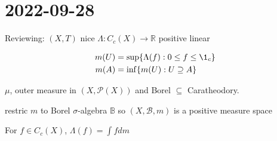 \section{ 2022-09-28 }


Reviewing: $(X,T)$ nice $\Lambda : C_c (X) \to \mathbb{R}$ positive linear

\begin{align*}
	m(U) &= \sup\{\Lambda(f) : 0 \leq f \leq \1_c\} \\
	m(A) &= \inf\{m(U) : U \contains  A\}
\end{align*} 

\begin{lemma}
	$\mu$, outer measure in  $(X,\mathcal{P}(X))$ and Borel $\subseteq$ Caratheodory.
\end{lemma}

\begin{lemma}
	restric $m$ to Borel $\sigma$-algebra $\mathbb{B}$ so $(X, \mathcal{B}, m)$ is a positive measure space
\end{lemma}

\begin{lemma}
	For $f \in C_c (X)$, $\Lambda(f) = \int f dm$
\end{lemma}

